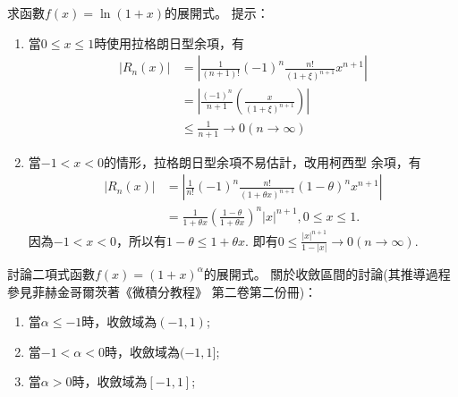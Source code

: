 \documentclass[a4paper,12pt]{article}
\theoremstyle{theorem}
\begin{document}
\begin{CJK*}{UTF8}{bsmi}
    \begin{example}
        求函數$\displaystyle f(x) = \ln (1+x)$的展開式。
        提示：
        \begin{enumerate}[label={\rm(\arabic*)}]
            \item 當$0 \le x \le 1$時使用拉格朗日型余項，有
                \[
                    \begin{split}
                        \left| R_n(x) \right| &  = 
                        \left| \frac{1}{(n+1)!}(-1)^n 
                        \frac{n!}{(1+\xi)^{n+1}}x^{n+1} \right| \\
                        & = \left|\frac{(-1)^n}{n+1}\left(\frac{x}
                        {(1+\xi)^{n+1}}\right)\right| \\
                        & \le \frac{1}{n+1} \to 0 (n \to \infty)
                    \end{split}
                \]
            \item 當$-1 < x < 0$的情形，拉格朗日型余項不易估計，改用柯西型
                余項，有
                \[
                    \begin{split}
                        \left| R_n(x) \right| & = \left| \frac{1}{n!}(-1)^n 
                        \frac{n!}{(1+\theta x)^{n+1}}(1-\theta)^n x^{n+1}
                        \right| \\
                        & = \frac{1}{1+\theta x}\left(\frac{1-\theta}
                        {1+\theta x}\right)^n\vert x \vert^{n+1}, 
                        0 \le x \le 1.
                    \end{split}
                \]
                因為$-1 < x < 0$，所以有$1 - \theta \le 1 + \theta x$.
                即有$\displaystyle 0 \le \frac{|x|^{n+1}}{1-|x|} \to 0 
                (n \to \infty)$.
        \end{enumerate}
    \end{example}
    \begin{example}
        討論二項式函數$f(x) = (1+x)^{\alpha}$的展開式。
        關於收斂區間的討論(其推導過程參見菲赫金哥爾茨著《微積分教程》
        第二卷第二份冊)：
        \begin{enumerate}[label={\rm(\arabic*)}]
            \item 當$\alpha \le -1$時，收斂域為$(-1,1)$;
            \item 當$-1 < \alpha < 0$時，收斂域為$(-1,1]$;
            \item 當$\alpha > 0$時，收斂域為$[-1, 1]$;
        \end{enumerate}
    \end{example}


\end{CJK*}
\end{document}
